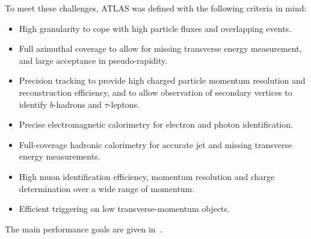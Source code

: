 To meet these challenges, ATLAS was defined with the following
criteria in mind:

\begin{itemize}
\item High granularity to  cope with high particle fluxes and overlapping events.
\item Full azimuthal coverage to allow for missing transverse energy
measurement, and large acceptance in pseudo-rapidity.
\item Precision tracking to provide high charged particle momentum resolution
and reconstruction efficiency, and to allow observation of secondary vertices to
identify $b$-hadrons and $\tau$-leptons.
\item Precise electromagnetic calorimetry for electron and photon
identification.
\item Full-coverage hadronic calorimetry for accurate jet and missing transverse
energy measurements.
\item High muon identification efficiency, momentum resolution and charge determination over a wide range of
momentum.
\item Efficient triggering on low transverse-momentum objects.
\end{itemize}

The main performance goals are given in~.

